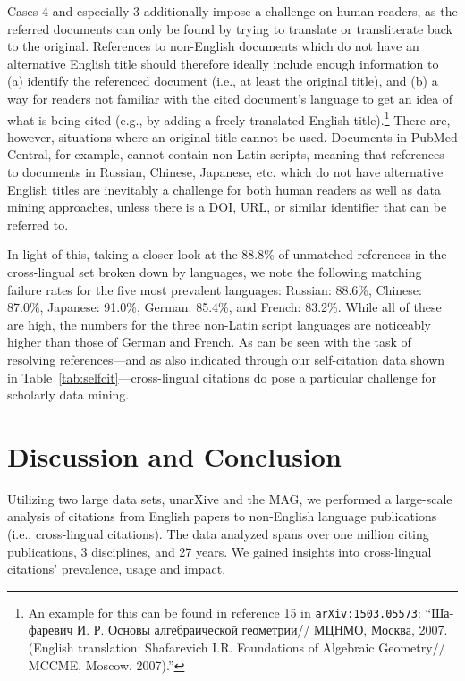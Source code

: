 Cases 4 and especially 3 additionally impose a challenge on human readers, as the referred documents can only be found by trying to translate or transliterate back to the original. References to non-English documents which do not have an alternative English title should therefore ideally include enough information to (a) identify the referenced document (i.e., at least the original title), and (b) a way for readers not familiar with the cited document's language to get an idea of what is being cited (e.g., by adding a freely translated English title).\footnote{An example for this can be found in reference 15 in \texttt{arXiv:1503.05573}: ``\foreignlanguage{russian}{Шафаревич И. Р. Основы алгебраической геометрии// МЦНМО, Москва, 2007.} (English translation: Shafarevich I.R. Foundations of Algebraic Geometry// MCCME, Moscow. 2007).''} There are, however, situations where an original title cannot be used. Documents in PubMed Central, for example, cannot contain non-Latin scripts, meaning that references to documents in Russian, Chinese, Japanese, etc. which do not have alternative English titles are inevitably a challenge for both human readers as well as data mining approaches, unless there is a DOI, URL, or similar identifier that can be referred to.

In light of this, taking a closer look at the 88.8\% of unmatched references in the cross-lingual set broken down by languages, we note the following matching failure rates for the five most prevalent languages: Russian: 88.6\%, Chinese: 87.0\%, Japanese: 91.0\%, German: 85.4\%, and French: 83.2\%. While all of these are high, the numbers for the three non-Latin script languages are noticeably higher than those of German and French. As can be seen with the task of resolving references---and as also indicated through our self-citation data shown in Table~\ref{tab:selfcit}---cross-lingual citations do pose a particular challenge for scholarly data mining.

\section{Discussion and Conclusion}
\label{sec:xling-conclusion}

Utilizing two large data sets, unarXive and the MAG, we performed a large-scale analysis of citations from English papers to non-English language publications (i.e., cross-lingual citations). The data analyzed spans over one million citing publications, 3 disciplines, and 27 years. We gained insights into cross-lingual citations' prevalence, usage and impact.

